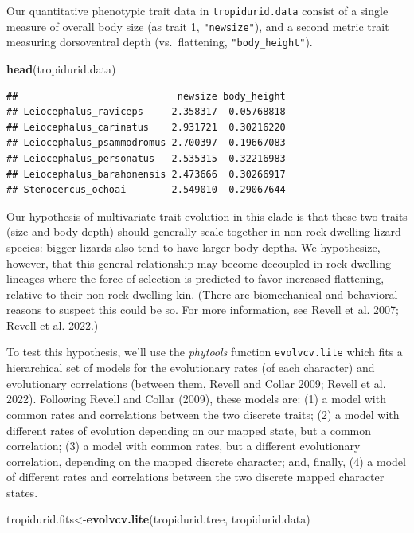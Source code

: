 \documentclass[fleqn,10pt,lineno]{wlpeerj} %
\newenvironment{Shaded}{\begin{snugshade}}{\end{snugshade}}
\newcommand{\FunctionTok}[1]{\textcolor[rgb]{0.13,0.29,0.53}{\textbf{#1}}}
\newcommand{\NormalTok}[1]{#1}
\newcommand{\OtherTok}[1]{\textcolor[rgb]{0.56,0.35,0.01}{#1}}
\begin{document}
Our quantitative phenotypic trait data in \texttt{tropidurid.data} consist of a single measure of overall body size (as trait 1, \texttt{"newsize"}), and a second metric trait measuring dorsoventral depth (vs.~flattening, \texttt{"body\_height"}).

\begin{Shaded}
\begin{Highlighting}[]
\FunctionTok{head}\NormalTok{(tropidurid.data)}
\end{Highlighting}
\end{Shaded}

\begin{verbatim}
##                            newsize body_height
## Leiocephalus_raviceps     2.358317  0.05768818
## Leiocephalus_carinatus    2.931721  0.30216220
## Leiocephalus_psammodromus 2.700397  0.19667083
## Leiocephalus_personatus   2.535315  0.32216983
## Leiocephalus_barahonensis 2.473666  0.30266917
## Stenocercus_ochoai        2.549010  0.29067644
\end{verbatim}

Our hypothesis of multivariate trait evolution in this clade is that these two traits (size and body depth) should generally scale together in non-rock dwelling lizard species: bigger lizards also tend to have larger body depths. We hypothesize, however, that this general relationship may become decoupled in rock-dwelling lineages where the force of selection is predicted to favor increased flattening, relative to their non-rock dwelling kin. (There are biomechanical and behavioral reasons to suspect this could be so. For more information, see Revell et al. 2007; Revell et al. 2022.)

To test this hypothesis, we'll use the \emph{phytools} function \texttt{evolvcv.lite} which fits a hierarchical set of models for the evolutionary rates (of each character) and evolutionary correlations (between them, Revell and Collar 2009; Revell et al. 2022). Following Revell and Collar (2009), these models are: (1) a model with common rates and correlations between the two discrete traits; (2) a model with different rates of evolution depending on our mapped state, but a common correlation; (3) a model with common rates, but a different evolutionary correlation, depending on the mapped discrete character; and, finally, (4) a model of different rates and correlations between the two discrete mapped character states.

\begin{Shaded}
\begin{Highlighting}[]
\NormalTok{tropidurid.fits}\OtherTok{\textless{}{-}}\FunctionTok{evolvcv.lite}\NormalTok{(tropidurid.tree,}
\NormalTok{  tropidurid.data)}
\end{Highlighting}
\end{Shaded}
\end{document}
